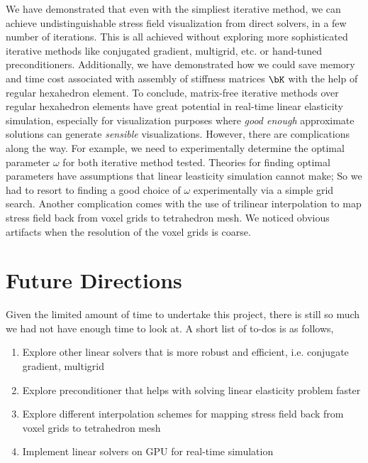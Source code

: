 \documentclass[11pt,titlepage]{article}
\begin{document}
We have demonstrated that even with the simpliest iterative method, we can achieve undistinguishable stress field visualization from direct solvers, in a few number of iterations. This is all achieved without exploring more sophisticated iterative methods like conjugated gradient, multigrid, etc. or hand-tuned preconditioners. Additionally, we have demonstrated how we could save memory and time cost associated with assembly of stiffness matrices $\bK$ with the help of regular hexahedron element. To conclude, matrix-free iterative methods over regular hexahedron elements have great potential in real-time linear elasticity simulation, especially for visualization purposes where \textit{good enough} approximate solutions can generate \textit{sensible} visualizations.
However, there are complications along the way. For example, we need to experimentally determine the optimal parameter $\omega$ for both iterative method tested. Theories for finding optimal parameters have assumptions that linear leasticity simulation cannot make; So we had to resort to finding a good choice of $\omega$ experimentally via a simple grid search. Another complication comes with the use of trilinear interpolation to map stress field back from voxel grids to tetrahedron mesh. We noticed obvious artifacts when the resolution of the voxel grids is coarse.

\section{Future Directions}

Given the limited amount of time to undertake this project, there is still so much we had not have enough time to look at. A short list of to-dos is as follows,
\begin{enumerate}
    \item Explore other linear solvers that is more robust and efficient, i.e. conjugate gradient, multigrid
    \item Explore preconditioner that helps with solving linear elasticity problem faster
    \item Explore different interpolation schemes for mapping stress field back from voxel grids to tetrahedron mesh
    \item Implement linear solvers on GPU for real-time simulation
\end{enumerate}

\newpage
\printbibliography
\end{document}
